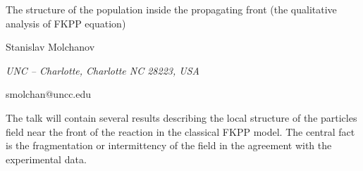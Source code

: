 \documentclass[10pt,a4paper]{article}
\begin{document}
\begin{center}

{\Large The structure of the population inside the propagating front
(the qualitative analysis of FKPP equation)
}

\bigskip

{\sc Stanislav Molchanov}

{\small\it UNC -- Charlotte, Charlotte NC 28223, USA}

{\small\rm smolchan@uncc.edu}

\end{center}

\bigskip


The talk will contain several results describing the local structure of the particles field near the front of the reaction in the classical FKPP model. The central fact is the fragmentation or intermittency of the field in the agreement with the experimental data.
\end{document}
